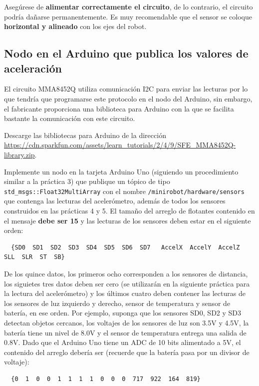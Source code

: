 \documentclass[letterpaper,12pt]{article}
\begin{document}
Asegúrese de \textbf{alimentar correctamente el circuito}, de lo contrario, el circuito podría dañarse permanentemente. Es muy recomendable que el sensor se coloque \textbf{horizontal y alineado} con los ejes del robot. 

\subsection{Nodo en el Arduino que publica los valores de aceleración}
El circuito MMA8452Q utiliza comunicación I2C para enviar las lecturas por lo que tendría que programarse este protocolo en el nodo del Arduino, sin embargo, el fabricante proporciona una biblioteca para Arduino con la que se facilita bastante la comunicación con este circuito. 

Descarge las bibliotecas para Arduino de la dirección \url{https://cdn.sparkfun.com/assets/learn_tutorials/2/4/9/SFE_MMA8452Q-library.zip}. 

Implemente un nodo en la tarjeta Arduino Uno (siguiendo un procedimiento similar a la práctica 3) que publique un tópico de tipo \texttt{std\_msgs::Float32MultiArray} con el nombre \texttt{/minirobot/hardware/sensors} que contenga las lecturas del acelerómetro, además de todos los sensores construidos en las prácticas 4 y 5. El tamaño del arreglo de flotantes contenido en el mensaje \textbf{debe ser 15} y las lecturas de los sensores deben estar en el siguiente orden: 

\begin{verbatim}
  {SD0  SD1  SD2  SD3  SD4  SD5  SD6  SD7   AccelX  AccelY  AccelZ   SLL  SLR  ST  SB}
\end{verbatim}

De los quince datos, los primeros ocho corresponden a los sensores de distancia, los siguietes tres datos deben ser cero (se utilizarán en la siguiente práctica para la lectura del acelerómetro) y los últimos cuatro deben contener las lecturas de los sensores de luz izquierdo y derecho, sensor de temperatura y sensor de batería, en ese orden. Por ejemplo, suponga que los sensores SD0, SD2 y SD3 detectan objetos cercanos, los voltajes de los sensores de luz son 3.5V y 4.5V, la batería tiene un nivel de 8.0V y el sensor de temperatura entrega una salida de 0.8V. Dado que el Arduino Uno tiene un ADC de 10 bits alimentado a 5V, el contenido del arreglo debería ser (recuerde que la batería pasa por un divisor de voltaje):
\begin{verbatim}
  {0  1  0  0  1  1  1  1  0  0  0  717  922  164  819}
\end{verbatim}
\end{document}
